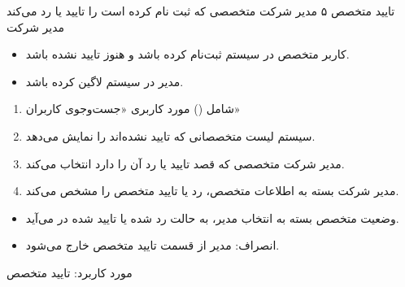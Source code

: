 \usecase
{تایید متخصص}
{۵}
{مدیر شرکت متخصصی که ثبت نام کرده است را تایید یا رد می‌کند}
{مدیر شرکت}
{}
{
	\begin{itemize}
	\item 
	کاربر متخصص در سیستم ثبت‌نام کرده باشد و هنوز تایید نشده باشد.
	
	\item
مدیر در سیستم لاگین کرده باشد.
\end{itemize}
}
{
\begin{enumerate}
	\item 
	شامل () مورد کاربری «جست‌وجوی کاربران»
	\item
	سیستم لیست متخصصانی که تایید نشده‌اند را نمایش می‌دهد.
	
	\item 
	مدیر شرکت متخصصی که قصد تایید یا رد آن را دارد انتخاب می‌کند.
	
	\item 
	مدیر شرکت بسته به اطلاعات متخصص، رد یا تایید متخصص را مشخص می‌کند.
\end{enumerate}
}
{\begin{itemize}
	\item
	وضعیت متخصص بسته به انتخاب مدیر، به حالت رد شده یا تایید شده در می‌آید.
\end{itemize}}
{
\begin{itemize}
	\item انصراف: مدیر از قسمت تایید متخصص خارج می‌شود.
\end{itemize}
}
{مورد کاربرد: تایید متخصص}




